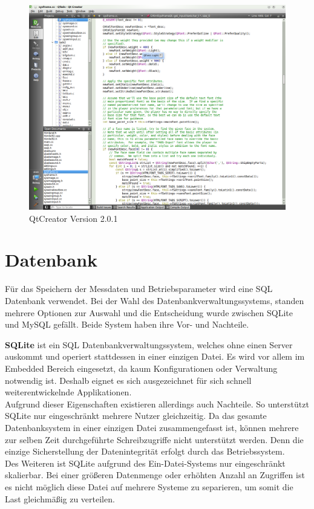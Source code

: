 \begin{figure}[h]
\begin{center}
\includegraphics[width=\textwidth]{img/general/QtCreator.png}
\caption{QtCreator Version 2.0.1}
\label{QtCreator}
\end{center}
\end{figure}
\newpage


\section{Datenbank}
\label{section_Datenbank}

Für das Speichern der Messdaten und Betriebsparameter wird eine \ac{SQL} Datenbank verwendet. Bei der Wahl des Datenbankverwaltungssystems, standen mehrere Optionen zur Auswahl und die Entscheidung wurde zwischen SQLite und MySQL gefällt.
Beide System haben ihre Vor- und Nachteile.


\textbf{SQLite} ist ein \ac{SQL} Datenbankverwaltungssystem, welches ohne einen Server auskommt und operiert stattdessen in einer einzigen Datei. Es wird vor allem im Embedded Bereich eingesetzt, da kaum Konfigurationen oder Verwaltung notwendig ist. Deshalb eignet es sich ausgezeichnet für sich schnell weiterentwickelnde Applikationen.
\\
Aufgrund dieser Eigenschaften existieren allerdings auch Nachteile. So unterstützt SQLite nur eingeschränkt mehrere Nutzer gleichzeitig. Da das gesamte Datenbanksystem in einer einzigen Datei zusammengefasst ist, können mehrere zur selben Zeit durchgeführte Schreibzugriffe nicht unterstützt werden. Denn die einzige Sicherstellung der Datenintegrität erfolgt durch das Betriebssystem. 
\\
Des Weiteren ist SQLite aufgrund des Ein-Datei-Systems nur eingeschränkt skalierbar. Bei einer größeren Datenmenge oder erhöhten Anzahl an Zugriffen ist es nicht möglich diese Datei auf mehrere Systeme zu separieren, um somit die Last gleichmäßig zu verteilen.

